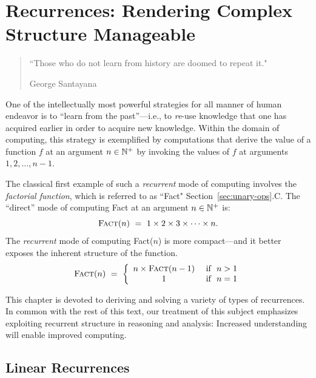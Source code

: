 
\chapter{Recurrences:
Rendering Complex Structure Manageable}
\label{ch:Recurrences}

\begin{quote}
``Those who do not learn from history are doomed to repeat it."

\hspace*{1in}George Santayana
\end{quote}

\bigskip

\noindent
One of the intellectually most powerful strategies for all manner of human endeavor is to ``learn from the past''---i.e., to {\em re}-use knowledge that one has acquired earlier in order to acquire new knowledge.  Within the domain of computing, this strategy is exemplified by computations that derive the value of a function $f$ at an argument $n \in \mathbb{N}^+$ by invoking the values of $f$ at arguments $1, 2, \ldots, n-1$.

\smallskip

The classical first example of such a {\it recurrent} mode of computing involves the {\it factorial function}, which is referred to as ``{\sc Fact}" Section~\ref{sec:unary-ops}.C.  The ``direct'' mode of computing {\sc Fact} at an argument $n \in \mathbb{N}^+$ is:
\[ \mbox{\sc Fact}(n) \ = \ 1 \times 2 \times 3 \times \cdots \times n. \]
The {\em recurrent} mode of computing {\sc Fact}($n$) is more compact---and it better exposes the inherent structure of the function.
\[ \mbox{\sc Fact}(n) \ = \ \left\{
\begin{array}{cl}
 n \times \mbox{\sc Fact}(n-1) & \mbox{ if } \ n > 1 \\
 1 & \mbox{ if } \ n = 1 \\
\end{array}
\right.
\]

\smallskip

This chapter is devoted to deriving and solving a variety of types of recurrences.  In common with the rest of this text, our treatment of this subject emphasizes exploiting recurrent structure in reasoning and analysis: Increased understanding will enable improved computing.


\section{Linear Recurrences}
\label{sec:linear-recurrences}

